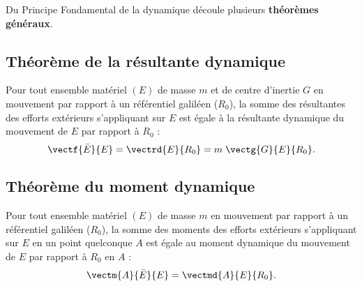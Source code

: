 Du Principe Fondamental de la dynamique découle plusieurs \textbf{théorèmes généraux}.

\subsection{Théorème de la résultante dynamique}

\begin{theoreme}
Pour tout ensemble matériel $(E)$ de masse $m$ et de centre d'inertie $G$ en mouvement par rapport à un référentiel galiléen ($R_0$), la somme des résultantes des efforts extérieurs s'appliquant sur $E$ est égale à la résultante dynamique du mouvement de $E$ par rapport à $R_0$ :
$$
\vectf{\bar E}{E}=\vectrd{E}{R_0}=m\;\vectg{G}{E}{R_0}.
$$
\end{theoreme}



\subsection{Théorème du moment dynamique}
\begin{theoreme}
			Pour tout ensemble matériel $(E)$ de masse $m$ en mouvement par rapport à un référentiel galiléen ($R_0$), la somme des moments des efforts extérieurs s'appliquant sur $E$ en un point quelconque $A$ est égale au moment dynamique du mouvement de $E$ par rapport à $R_0$ en $A$ :
			$$
				\vectm{A}{\bar E}{E}=\vectmd{A}{E}{R_0}.
			$$
		\end{theoreme}

%
%
%

